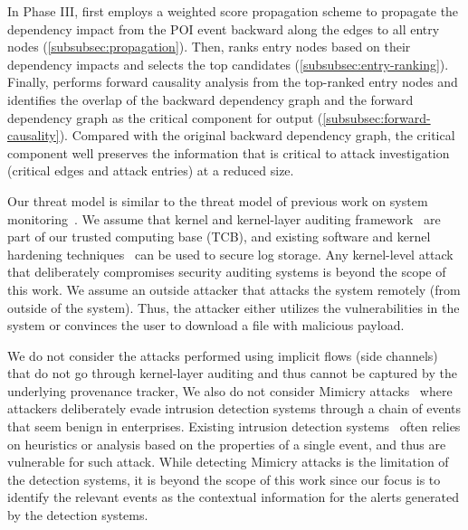 %
In Phase III, \tool first employs a weighted score propagation scheme to
propagate the dependency impact from the POI event 
backward along the edges to all entry nodes (\cref{subsubsec:propagation}).
Then, \tool ranks entry nodes based on their dependency impacts and selects the top candidates (\cref{subsubsec:entry-ranking}).
Finally, \tool performs forward causality analysis from the top-ranked entry nodes and identifies the overlap of the backward dependency graph and the forward dependency graph as the critical component for output (\cref{subsubsec:forward-causality}). 
Compared with the original backward dependency graph, the critical component well preserves the information that is critical to attack investigation (critical edges and attack entries) at a reduced size.




Our threat model is similar to the threat model of previous work on system monitoring~\cite{backtracking,backtracking2,loggc,gao2018aiql,gao2018saql,liu2018priotracker,hassan2019nodoze}. 
We assume that kernel and kernel-layer auditing framework~\cite{auditd,etw,dtrace,sysdig} are part of our trusted computing base (TCB), and existing software and kernel hardening techniques~\cite{trustkernel,tamperlog} can be used to secure log storage.
Any kernel-level attack that deliberately compromises security auditing systems is beyond the scope of this work.
We assume an outside attacker that attacks the system remotely (from outside of the system). Thus, the attacker either utilizes the vulnerabilities in the system or convinces the user to download a file with malicious payload.

We do not consider the attacks performed using implicit flows (\eg side channels) that do not go through kernel-layer auditing and thus cannot be captured by the underlying provenance tracker, 
We also do not consider Mimicry attacks~\cite{mimicry} where attackers deliberately evade intrusion detection systems through a chain of events that seem benign in enterprises. 
Existing intrusion detection systems~\cite{securitybook,intrusionbook,netwrix} often relies on heuristics or analysis based on the properties of a single event, and thus are vulnerable for such attack.
While detecting Mimicry attacks is the limitation of the detection systems, it is beyond the scope of this work since our focus is to identify the relevant events as the contextual information for the alerts generated by the detection systems.




